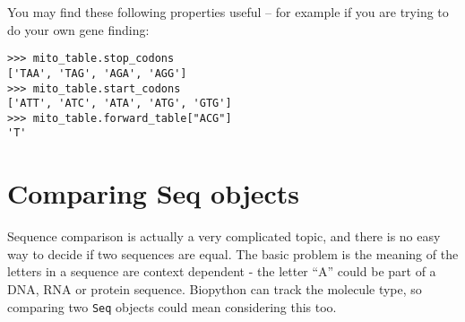You may find these following properties useful -- for example if you are trying
to do your own gene finding:

\begin{verbatim}
>>> mito_table.stop_codons
['TAA', 'TAG', 'AGA', 'AGG']
>>> mito_table.start_codons
['ATT', 'ATC', 'ATA', 'ATG', 'GTG']
>>> mito_table.forward_table["ACG"]
'T'
\end{verbatim}

\section{Comparing Seq objects}
\label{sec:seq-comparison}

Sequence comparison is actually a very complicated topic, and there is no easy
way to decide if two sequences are equal. The basic problem is the meaning of
the letters in a sequence are context dependent - the letter ``A'' could be part
of a DNA, RNA or protein sequence. Biopython can track the molecule type, so
comparing two \verb|Seq| objects could mean considering this too.

